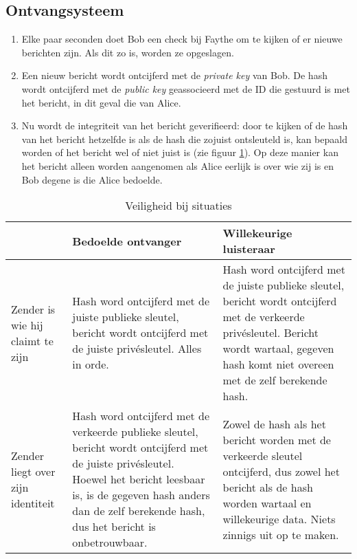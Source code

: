 \documentclass{report} %
\begin{document}
\subsection{Ontvangsysteem}
\begin{enumerate}
    \item Elke paar seconden doet Bob een check bij Faythe om te kijken of er nieuwe berichten zijn. Als dit zo is, worden ze opgeslagen.
    \item Een nieuw bericht wordt ontcijferd met de \textit{private key} van Bob. De hash wordt ontcijferd met de \textit{public key} geassocieerd met de ID die gestuurd is met het bericht, in dit geval die van Alice.
    \item Nu wordt de integriteit van het bericht geverifieerd: door te kijken of de hash van het bericht hetzelfde is als de hash die zojuist ontsleuteld is, kan bepaald worden of het bericht wel of niet juist is (zie figuur \ref{tab:send_receive_truthtable}). Op deze manier kan het bericht alleen worden aangenomen als Alice eerlijk is over wie zij is en Bob degene is die Alice bedoelde.
\end{enumerate}

\begin{table}[htp]
    \centering
    \begin{tabular}{p{3cm}|p{5cm}|p{5cm}}
    & Bedoelde ontvanger & Willekeurige luisteraar \\ \hline
    Zender is wie hij claimt te zijn & Hash word ontcijferd met de juiste publieke sleutel, bericht wordt ontcijferd met de juiste privésleutel. Alles in orde. & Hash word ontcijferd met de juiste publieke sleutel, bericht wordt ontcijferd met de verkeerde privésleutel. Bericht wordt wartaal, gegeven hash komt niet overeen met de zelf berekende hash. \\ \hline
    Zender liegt over zijn identiteit & Hash word ontcijferd met de verkeerde publieke sleutel, bericht wordt ontcijferd met de juiste privésleutel. Hoewel het bericht leesbaar is, is de gegeven hash anders dan de zelf berekende hash, dus het bericht is onbetrouwbaar. & Zowel de hash als het bericht worden met de verkeerde sleutel ontcijferd, dus zowel het bericht als de hash worden wartaal en willekeurige data. Niets zinnigs uit op te maken. \\
    \end{tabular}
    \caption{Veiligheid bij situaties}
    \label{tab:send_receive_truthtable}
\end{table}

\newpage
\end{document}
